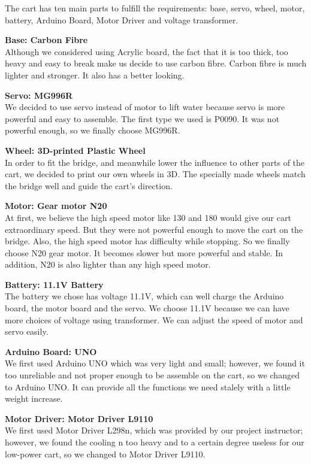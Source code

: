 The cart has ten main parts to fulfill the requirements: base, servo, wheel,
motor, battery, Arduino Board, Motor Driver and voltage transformer.

\bigskip
\noindent
\textbf{Base: Carbon Fibre} \\
\indent
Although we considered using Acrylic board, the fact that it is too thick, too
heavy and easy to break make us decide to use carbon fibre.
Carbon fibre is much lighter and stronger.
It also has a better looking. 

\bigskip
\noindent
\textbf{Servo: MG996R}  \\
\indent
We decided to use servo instead of motor to lift water because servo is more
powerful and easy to assemble. 
The first type we used is P0090.
It was not powerful enough, so we finally choose MG996R. 

\bigskip
\noindent
\textbf{Wheel: 3D-printed Plastic Wheel } \\
\indent
In order to fit the bridge, and meanwhile lower the influence to other parts of
the cart, we decided to print our own wheels in 3D.
The specially made wheels match the bridge well and guide the cart’s direction.

\bigskip
\noindent
\textbf{Motor: Gear motor N20 } \\
\indent
At first, we believe the high speed motor like 130 and 180 would give our cart
extraordinary speed.
But they were not powerful enough to move the cart on the bridge.
Also, the high speed motor has difficulty while stopping.
So we finally choose N20 gear motor.
It becomes slower but more powerful and stable.
In addition, N20 is also lighter than any high speed motor.  

\bigskip
\noindent
\textbf{Battery: 11.1V Battery } \\
\indent
The battery we chose has voltage 11.1V, which can well charge the Arduino board,
the motor board and the servo.
We choose 11.1V because we can have more choices of voltage using transformer.
We can adjust the speed of motor and servo easily.  

\bigskip
\noindent
\textbf{Arduino Board: UNO } \\
\indent
We first used Arduino UNO which was very light and small; however, we found it
too unreliable and not proper enough to be assemble on the cart, so we changed
to Arduino UNO.
It can provide all the functions we need stalely with a little weight increase.

\bigskip
\noindent
\textbf{Motor Driver: Motor Driver L9110 } \\
\indent
We first used Motor Driver L298n, which was provided by our project instructor;
however, we found the cooling n too heavy and to a certain degree useless for
our low-power cart, so we changed to Motor Driver L9110.

